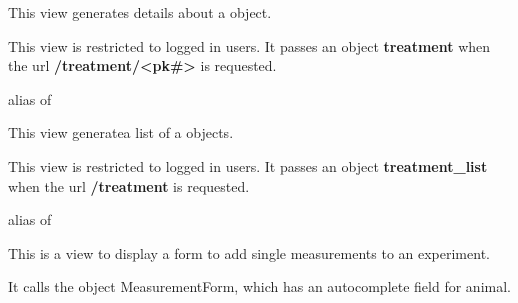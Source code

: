 \documentclass[letterpaper,10pt,english]{sphinxmanual}
\begin{document}
\begin{fulllineitems}
\label{data:mousedb.data.views.TreatmentDetail}
This view generates details about a {\hyperref[data:mousedb.data.models.Treatment]{}} object.

This view is restricted to logged in users.
It passes an object \textbf{treatment} when the url \textbf{/treatment/\textless{}pk\#\textgreater{}} is requested.

\begin{fulllineitems}
\label{data:mousedb.data.views.TreatmentDetail.model}
alias of 

\end{fulllineitems}


\end{fulllineitems}


\begin{fulllineitems}
\label{data:mousedb.data.views.TreatmentList}
This view generatea list of a {\hyperref[data:mousedb.data.models.Treatment]{}} objects.

This view is restricted to logged in users.
It passes an object \textbf{treatment\_list} when the url \textbf{/treatment} is requested.

\begin{fulllineitems}
\label{data:mousedb.data.views.TreatmentList.model}
alias of 

\end{fulllineitems}


\end{fulllineitems}


\begin{fulllineitems}
\label{data:mousedb.data.views.add_measurement}
This is a view to display a form to add single measurements to an experiment.

It calls the object MeasurementForm, which has an autocomplete field for animal.

\end{fulllineitems}
\end{document}
